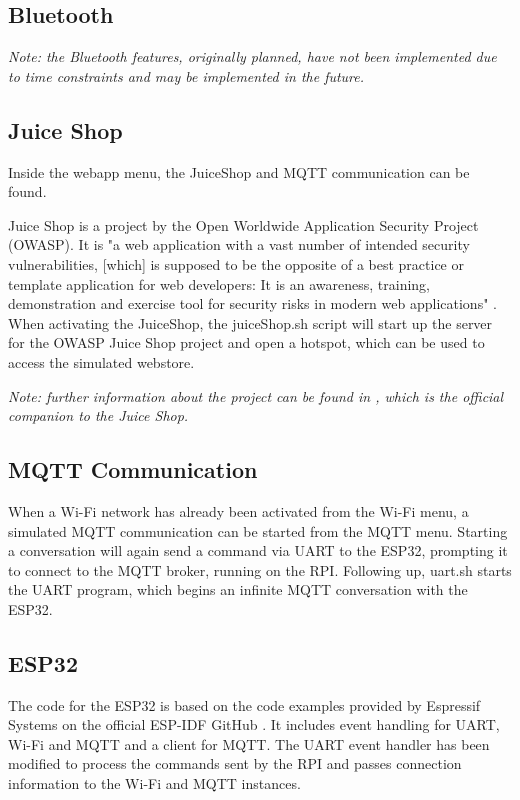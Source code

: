 

\subsection{Bluetooth}
\textit{Note: the Bluetooth features, originally planned, have not been implemented due to time constraints and may be implemented in the future.}

\subsection{Juice Shop}
Inside the webapp menu, the JuiceShop and MQTT communication can be found.

Juice Shop is a project by the Open Worldwide Application Security Project (OWASP).
It is "a web application with a vast number of intended security vulnerabilities, [which] is supposed to be the opposite of a best practice or template application for web developers: It is an awareness, training, demonstration and exercise tool for security risks in modern web applications" \cite{PWNING_JuiceShop}.
When activating the JuiceShop, the juiceShop.sh script will start up the server for the OWASP Juice Shop project and open a hotspot, which can be used to access the simulated webstore.

\textit{Note: further information about the project can be found in \cite{PWNING_JuiceShop}, which is the official companion to the Juice Shop.}

\subsection{MQTT Communication}
When a Wi-Fi network has already been activated from the Wi-Fi menu, a simulated MQTT communication can be started from the MQTT menu.
Starting a conversation will again send a command via UART to the ESP32, prompting it to connect to the MQTT broker, running on the RPI.
Following up, uart.sh starts the UART program, which begins an infinite MQTT conversation with the ESP32.

\subsection{ESP32}
The code for the ESP32 is based on the code examples provided by Espressif Systems on the official ESP-IDF GitHub \cite{espidf}.
It includes event handling for UART, Wi-Fi and MQTT and a client for MQTT.
The UART event handler has been modified to process the commands sent by the RPI and passes connection information to the Wi-Fi and MQTT instances.

